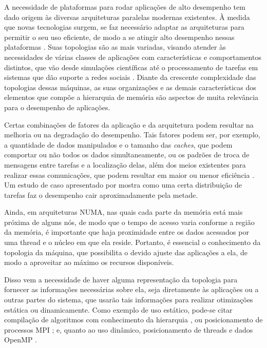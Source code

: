 A necessidade de plataformas para rodar aplicações de alto desempenho tem dado origem às diversas arquiteturas paralelas modernas existentes.
À medida que novas tecnologias surgem, se faz necessário adaptar as arquiteturas
para permitir o seu uso eficiente, de modo a se atingir alto desempenho nessas plataformas \cite{ataque}.
Suas topologias são as mais variadas, visando atender às necessidades de várias classes de aplicações com características e comportamentos distintos, que vão desde simulações científicas até o processamento de tarefas em sistemas que dão suporte a redes sociais \cite{sociais}.
Diante da crescente complexidade das topologias dessas máquinas, as suas organizações e as demais características dos elementos que compõe a hierarquia de memória são aspectos de muita relevância para o desempenho de aplicações.

Certas combinações de fatores da aplicação e da arquitetura podem resultar na melhoria ou na degradação do desempenho.
Tais fatores podem ser, por exemplo, a quantidade de dados manipulados e o tamanho das \textit{caches}, que podem comportar ou não todos os dados simultaneamente, ou os padrões de troca de mensagens entre tarefas e a localização delas, além dos meios existentes para realizar essas comunicações, que podem resultar em maior ou menor eficiência \cite{Sequoia}. Um estudo de caso apresentado por  mostra como uma certa distribuição de tarefas faz o desempenho cair aproximadamente pela metade.

Ainda, em arquiteturas NUMA, nas quais
cada parte da memória está mais próxima de alguns nós,
de modo que o tempo de acesso varia conforme a região da memória,
é importante que haja proximidade entre os dados acessados por uma thread e o núcleo em que ela reside.
Portanto, é essencial o conhecimento da topologia da máquina, que possibilita o devido ajuste das aplicações a ela, de modo a aproveitar ao máximo os recursos disponíveis.

Disso vem a necessidade de haver alguma representação da topologia para fornecer as informações necessárias sobre ela, seja diretamente às aplicações ou a outras partes do sistema, que usarão tais informações para realizar otimizações estática ou dinamicamente.
Como exemplo de uso estático, pode-se citar compilação de algoritmos com conhecimento da hierarquia \cite{Sequoia}, ou posicionamento de processos MPI \cite{hwloc2010}; e, quanto ao uso dinâmico, posicionamento de threads e dados OpenMP \cite{FGOMP}.

